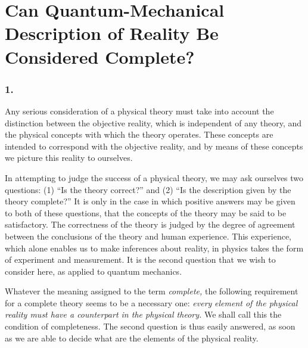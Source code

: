 \chapter{Can Quantum-Mechanical Description of Reality Be Considered Complete?}



\renewcommand{\theequation}{\arabic{equation}}

\subsection*{1.}

Any serious consideration of a physical theory must take into account
the distinction between the objective reality, which is independent of
any theory, and the physical concepts with which the theory operates.
These concepts are intended to correspond with the objective reality,
and by means of these concepts we picture this reality to ourselves.

In attempting to judge the success of a physical theory, we may ask
ourselves two questions: (1) ``Is the theory correct?'' and (2) ``Is the
description given by the theory complete?'' It is only in the case in
which positive answers may be given to both of these questions, that the
concepts of the theory may be said to be satisfactory. The correctness
of the theory is judged by the degree of agreement between the
conclusions of the theory and human experience. This experience, which
alone enables us to make inferences about reality, in physics takes the
form of experiment and measurement. It is the second question that we
wish to consider here, as applied to quantum mechanics.

Whatever the meaning assigned to the term \emph{complete,} the following
requirement for a complete theory seems to be a necessary one:
\emph{every} \emph{element of the physical reality must have a
counterpart in the physical theory.} We shall call this the condition of
completeness. The second question is thus easily answered, as soon as we
are able to decide what are the elements of the physical reality.

